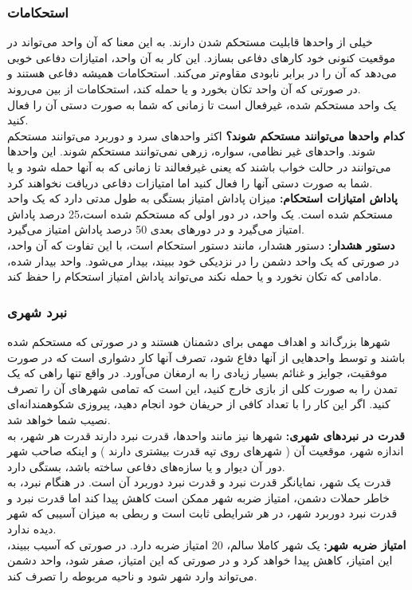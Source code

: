 \documentclass[]{article}
\begin{document}
\subsubsection*{{\titr استحکامات}}
خیلی از واحد‌ها قابلیت مستحکم شدن دارند. به این معنا که آن واحد می‌تواند در موقعیت کنونی خود کار‌های دفاعی بسازد. این کار به آن واحد، امتیازات دفاعی خوبی می‌دهد که آن را در برابر نابودی مقاوم‌تر می‌کند. استحکامات همیشه دفاعی هستند و در صورتی که آن واحد تکان بخورد و یا حمله کند، استحکامات از بین می‌روند.
\\یک واحد مستحکم شده، غیرفعال است تا زمانی که شما به صورت دستی آن را فعال کنید.
\\\noindent \textbf{کدام واحد‌ها می‌توانند مستحکم شوند؟} اکثر واحد‌های سرد و دوربرد می‌توانند مستحکم شوند. واحد‌های غیر نظامی، سواره، زرهی نمی‌توانند مستحکم شوند. این واحد‌ها می‌توانند در حالت خواب باشند که یعنی غیرفعالند تا زمانی که به آنها حمله شود و یا شما به صورت دستی آنها را فعال کنید اما امتیازات دفاعی دریافت نخواهند کرد.
\\\noindent \textbf{پاداش امتیازات استحکام:} میزان پاداش امتیاز بستگی به طول مدتی دارد که یک واحد مستحکم شده است. یک واحد، در دور اولی که مستحکم شده است،25 درصد پاداش امتیاز می‌گیرد و در دور‌های بعدی 50 درصد پاداش امتیاز می‌گیرد.
\\\noindent \textbf{دستور هشدار:} دستور هشدار، مانند دستور استحکام است، با این تفاوت که آن واحد، در صورتی که یک واحد دشمن را در نزدیکی خود ببیند، بیدار می‌شود. واحد بیدار شده، مادامی که تکان نخورد و یا حمله نکند می‌تواند پاداش امتیاز استحکام را حفظ کند.
\subsubsection*{{\titr نبرد شهری}}
شهر‌ها بزرگ‌اند و اهداف مهمی برای دشمنان هستند و در صورتی که مستحکم شده باشند و توسط واحد‌هایی از آنها دفاع شود، تصرف آنها کار دشواری است که در صورت موفقیت، جوایز و غنائم بسیار زیادی را به ارمغان می‌آورد. در واقع تنها راهی که یک تمدن را به صورت کلی از بازی خارج کنید، این است که تمامی شهر‌های آن را تصرف کنید. اگر این کار را با تعداد کافی از حریفان خود انجام دهید،  پیروزی شکوهمندانه‌ای نصیب شما خواهد شد.
\\\noindent \textbf{قدرت در نبردهای شهری:} شهر‌ها نیز مانند واحد‌ها، قدرت نبرد دارند قدرت هر شهر، به اندازه شهر، موقعیت آن ( شهر‌های روی تپه قدرت بیشتری دارند ) و اینکه صاحب شهر دور آن دیوار و یا سازه‌های دفاعی ساخته باشد، بستگی دارد.\\
قدرت یک شهر، نمایانگر قدرت نبرد و قدرت نبرد دوربرد آن است. در هنگام نبرد، به خاطر حملات دشمن، امتیاز ضربه شهر ممکن است کاهش پیدا کند اما قدرت نبرد و قدرت نبرد دوربرد شهر، در هر شرایطی ثابت است و ربطی به میزان آسیبی که شهر دیده ندارد.
\\\noindent \textbf{امتیاز ضربه شهر:} یک شهر کاملا سالم، 20 امتیاز ضربه دارد. در صورتی که آسیب ببیند، این امتیاز، کاهش پیدا خواهد کرد و در صورتی که این امتیاز، صفر شود، واحد دشمن می‌تواند وارد شهر شود و ناحیه مربوطه را تصرف کند.
\end{document}
